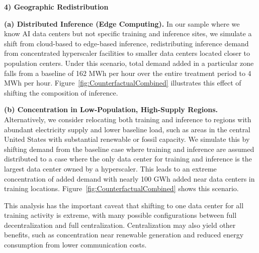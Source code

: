 \documentclass[a4paper,fleqn,longmktitle]{cas-sc}
\theoremstyle{plain}
\theoremstyle{definition}
\begin{document}
\noindent\textbf{4) Geographic Redistribution}


\noindent\textbf{(a) Distributed Inference (Edge Computing).} In our sample where we know AI data centers but not specific training and inference sites, we simulate a shift from cloud-based to edge-based inference, redistributing inference demand from concentrated hyperscaler facilities to smaller data centers located closer to population centers. Under this scenario, total demand added in a particular zone falls from a baseline of 162 MWh per hour over the entire treatment period to 4 MWh per hour. Figure~\ref{fig:CounterfactualCombined} illustrates this effect of shifting the composition of inference.


\noindent\textbf{(b) Concentration in Low-Population, High-Supply Regions.} Alternatively, we consider relocating both training and inference to regions with abundant electricity supply and lower baseline load, such as areas in the central United States with substantial renewable or fossil capacity. We simulate this by shifting demand from the baseline case where training and inference are assumed distributed to a case where the only data center for training and inference is the largest data center owned by a hyperscaler. This leads to an extreme concentration of added demand with nearly 100 GWh added near data centers in training locations. Figure~\ref{fig:CounterfactualCombined} shows this scenario.

This analysis has the important caveat that shifting to one data center for all training activity is extreme, with many possible configurations between full decentralization and full centralization. Centralization may also yield other benefits, such as concentration near renewable generation and reduced energy consumption from lower communication costs.

\end{document}
